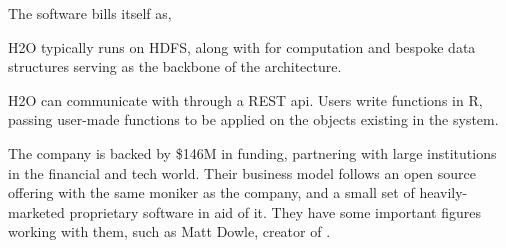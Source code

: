 The  software bills itself as,


H2O typically runs on HDFS, along with  for computation and bespoke
data structures serving as the backbone of the architecture.

H2O can communicate with \R through a REST api. Users write functions in
R, passing user-made functions to be applied on the objects existing in
the  system\cite{h2o.ai:_h2o}.

The company  is backed by \$146M in funding, partnering with large
institutions in the financial and tech world. Their business model
follows an open source offering with the same moniker as the company,
and a small set of heavily-marketed proprietary software in aid of it.
They have some important figures working with them, such as Matt Dowle,
creator of .
